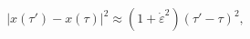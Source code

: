 \begin{equation}
|x(\tau')-x(\tau)|^2\approx \left(1+\dot{\varepsilon}^2\right)(\tau'-\tau)^2,
\end{equation}

